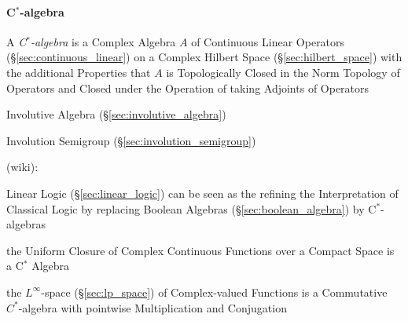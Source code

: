 \paragraph{C$^*$-algebra}\label{sec:cstar_algebra}\hfill

A \emph{C$^*$-algebra} is a Complex Algebra $A$ of Continuous Linear
Operators (\S\ref{sec:continuous_linear}) on a Complex Hilbert Space
(\S\ref{sec:hilbert_space}) with the additional Properties that $A$ is
Topologically Closed in the Norm Topology of Operators and Closed
under the Operation of taking Adjoints of Operators

Involutive Algebra (\S\ref{sec:involutive_algebra})

Involution Semigroup (\S\ref{sec:involution_semigroup})

(wiki):

Linear Logic (\S\ref{sec:linear_logic}) can be seen as the refining
the Interpretation of Classical Logic by replacing Boolean Algebras
(\S\ref{sec:boolean_algebra}) by C$^*$-algebras

the Uniform Closure of Complex Continuous Functions over a Compact Space is a
C$^*$ Algebra

the $L^\infty$-space (\S\ref{sec:lp_space}) of Complex-valued Functions is a
Commutative $C^*$-algebra with pointwise Multiplication and Conjugation


